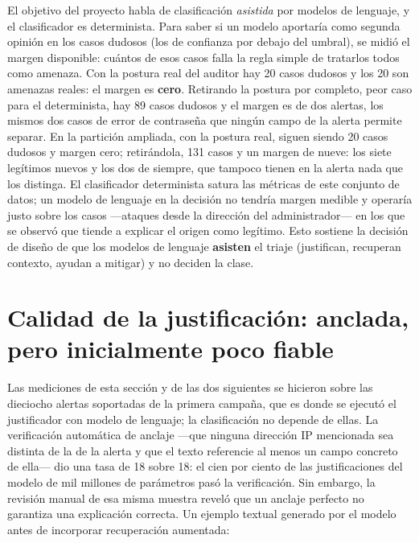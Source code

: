El objetivo del proyecto habla de clasificación \emph{asistida} por modelos de lenguaje, y el
clasificador es determinista. Para saber si un modelo aportaría como segunda opinión en los casos
dudosos (los de confianza por debajo del umbral), se midió el margen disponible: cuántos de esos
casos falla la regla simple de tratarlos todos como amenaza. Con la postura real del auditor hay
20 casos dudosos y los 20 son amenazas reales: el margen es \textbf{cero}. Retirando la postura por
completo, peor caso para el determinista, hay 89 casos dudosos y el margen es de dos alertas, los
mismos dos casos de error de contraseña que ningún campo de la alerta permite separar. En la
partición ampliada, con la postura real, siguen siendo 20 casos dudosos y margen cero; retirándola,
131 casos y un margen de nueve: los siete legítimos nuevos y los dos de siempre, que tampoco tienen
en la alerta nada que los distinga. El clasificador determinista satura las métricas de este
conjunto de datos; un modelo de lenguaje en
la decisión no tendría margen medible y operaría justo sobre los casos ---ataques desde la dirección
del administrador--- en los que se observó que tiende a explicar el origen como legítimo. Esto
sostiene la decisión de diseño de que los modelos de lenguaje \textbf{asisten} el triaje
(justifican, recuperan contexto, ayudan a mitigar) y no deciden la clase.

\section{Calidad de la justificación: anclada, pero inicialmente poco fiable}

Las mediciones de esta sección y de las dos siguientes se hicieron sobre las dieciocho alertas
soportadas de la primera campaña, que es donde se ejecutó el justificador con modelo de lenguaje;
la clasificación no depende de ellas. La verificación automática de anclaje ---que ninguna dirección IP mencionada sea distinta de la de
la alerta y que el texto referencie al menos un campo concreto de ella--- dio una tasa de 18 sobre
18: el cien por ciento de las justificaciones del modelo de mil millones de parámetros pasó la
verificación. Sin embargo, la revisión manual de esa misma muestra reveló que un anclaje perfecto
no garantiza una explicación correcta. Un ejemplo textual generado por el modelo antes de
incorporar recuperación aumentada:

